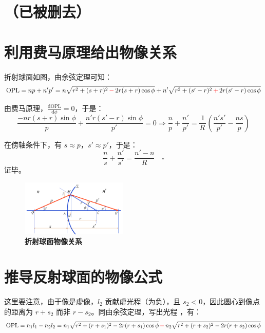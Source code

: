 \documentclass[UTF8]{report}
\theoremstyle{MyLineTheoremStyle} %
\theoremstyle{MyBlockTheoremStyle} %
\theoremstyle{MySubsubsectionStyle} %
\begin{document}
\section{（已被删去）}
\section{利用费马原理给出物像关系}

折射球面如图，由余弦定理可知：
\begin{equation}
\text{OPL} = np + n'p' 
= n \sqrt{r^2 + (s+r)^2 \,{\color{red} -}\, 2r(s+r)\cos \phi } + n' \sqrt{r^2 + (s'-r)^2 \,{\color{red} +}\, 2r(s'-r)\cos \phi } 
\end{equation}

由费马原理，$\frac{\mathrm{d} \text{OPL}  }{\mathrm{d} \phi } = 0$，于是：
\begin{equation}
\frac{-nr(s+r)\sin \phi }{p} + \frac{n'r(s'-r)\sin \phi }{p'} = 0 \Longrightarrow  \frac{n}{p} + \frac{n'}{p'} = \frac{1}{R\,}\left( \frac{n's'}{p'} - \frac{ns}{p} \right)
\end{equation}

在傍轴条件下，有 $s \approx p$，$s' \approx p'$，于是：
\begin{equation}
\frac{n}{s} + \frac{n'}{s'} = \frac{n' - n}{R}   \quad\square
\end{equation}
证毕。
\begin{figure}[H]\centering
\includegraphics[width=0.45\textwidth]{assets/1/7dd67844c3c8000268c32546583de193.png}
\caption{\textbf{折射球面物像关系}}\label{折射球面物像关系}
\end{figure}

\section{推导反射球面的物像公式}

这里要注意，由于像是虚像，$l_2$ 贡献虚光程（为负），且 $s_2<0$，因此圆心到像点的距离为 $r+s_2$ 而非 $r-s_2$。同由余弦定理，写出光程 ，有：
\begin{equation}
\text{OPL} = n_1l_1 - n_2l_2 
=
n_1\sqrt{r^2 + (r+s_1)^2 - 2r(r+s_1)\cos \phi } \,{\color{red} -}\, n_2 \sqrt{r^2 + (r+s_2)^2 - 2r(r+s_2)\cos \phi } 
\end{equation}
\end{document}

